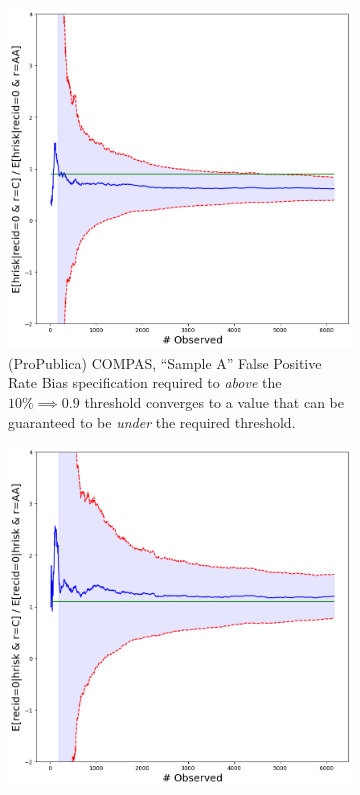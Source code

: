 \begin{figure}[ht!]
    \begin{subfigure}{0.45\linewidth}
        \centering
        \includegraphics[width=\linewidth]{avoir/images/compas-propublica-et.png}
        \caption{(ProPublica) COMPAS, ``Sample A'' False Positive Rate Bias specification required to \emph{above} the $10\% \implies 0.9$ threshold converges to a value that can be guaranteed to be \emph{under} the required threshold.}
        \label{fig:casestudy:compas:propublica}
    \end{subfigure}
    \hfill
    \begin{subfigure}{0.45\linewidth}
        \centering
        \includegraphics[width=\linewidth]{avoir/images/compas-northpointe-et.png}

\end{subfigure}
\end{figure}
